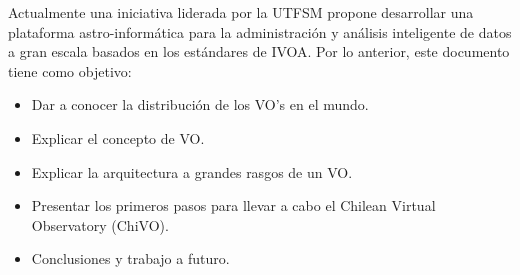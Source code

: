 Actualmente una iniciativa liderada por la UTFSM propone
desarrollar una plataforma astro-informática para la administración y análisis
inteligente de datos a gran escala basados en los estándares de IVOA.  Por lo
anterior, este documento tiene como objetivo:

\begin{itemize}
	\item Dar a conocer la distribución de los VO's en el mundo.
	\item Explicar el concepto de VO.
	\item Explicar la arquitectura a grandes rasgos de un
		VO.
	\item Presentar los primeros pasos para llevar a cabo el
		Chilean Virtual Observatory (ChiVO).
	\item Conclusiones y trabajo a futuro.
\end{itemize}
